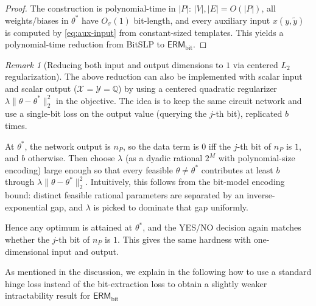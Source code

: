 \documentclass{article}
\newcommand{\Q}{\mathbb{Q}}
\newcommand{\cX}{\mathcal{X}}
\newcommand{\cY}{\mathcal{Y}}
\theoremstyle{plain}
\theoremstyle{definition}
\theoremstyle{remark}
\newtheorem{remark}[theorem]{Remark}
\begin{document}
\begin{proof}
	The construction is polynomial-time in $|P|$:
	$|V|,|E|=O(|P|)$, all weights/biases in $\theta^\ast$ have $O_\sigma(1)$ bit-length,
	and every auxiliary input $x(y,\tilde y)$ is computed by \eqref{eq:aux-input} from constant-sized templates.
	This yields a polynomial-time reduction from BitSLP to $\mathsf{ERM}_{\text{bit}}$. 
\end{proof}



\begin{remark}[Reducing both input and output dimensions to $1$ via centered $L_2$ regularization]
\label{rem:one-dim-via-l2}
The above reduction can also be implemented with scalar input and scalar output
(\(\cX=\cY=\Q\)) by using a centered quadratic regularizer
\(\lambda\|\theta-\theta^\ast\|_2^2\) in the objective.
The idea is to keep the same circuit network and use a single-bit loss on the
output value (querying the \(j\)-th bit), replicated \(b\) times.

At \(\theta^\ast\), the network output is \(n_P\), so the data term is \(0\) iff
the \(j\)-th bit of \(n_P\) is \(1\), and \(b\) otherwise. Then choose
\(\lambda\) (as a dyadic rational \(2^M\) with polynomial-size encoding) large
enough so that every feasible \(\theta\neq\theta^\ast\) contributes at least
\(b\) through \(\lambda\|\theta-\theta^\ast\|_2^2\). Intuitively, this follows
from the bit-model encoding bound: distinct feasible rational parameters are
separated by an inverse-exponential gap, and \(\lambda\) is picked to dominate
that gap uniformly.

Hence any optimum is attained at \(\theta^\ast\), and the YES/NO decision again
matches whether the \(j\)-th bit of \(n_P\) is \(1\). This gives the same
hardness with one-dimensional input and output.
\end{remark}


As mentioned in the discussion, we explain in the following how to use a standard hinge loss instead of the bit-extraction loss to obtain a slightly weaker intractability result for $\mathsf{ERM}_{\text{bit}}$
\end{document}
